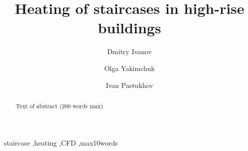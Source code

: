 \documentclass[preprint,12pt]{elsarticle}
\begin{document}
\begin{frontmatter}



\title{Heating of staircases in high-rise buildings}


\author{Dmitry Ivanov}

\author{Olga Yakimchuk}
\author{Ivan Pastukhov}



\address {ENGEX, adress Moscow}


\begin{abstract}
Text of abstract (200 words max)
\end{abstract}

\begin{keyword}
staircase \sep heating \sep CFD \sep max10words


\end{keyword}

\end{frontmatter}

\end{document}
